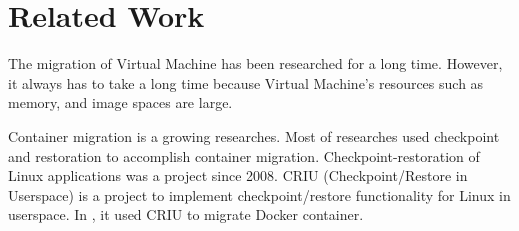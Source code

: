 \chapter{Related Work}
\label{chap:related}

The migration of Virtual Machine \cite{clark2005live, liu2013performance} has been researched for a long time.
However, it always has to take a long time because Virtual Machine's resources such as memory, and image spaces are large.

Container migration is a growing researches. Most of researches used checkpoint and restoration to accomplish container migration.
Checkpoint-restoration of Linux applications \cite{laadan2010linux} was a project since 2008. CRIU (Checkpoint/Restore in Userspace) is a project to implement checkpoint/restore functionality for Linux in userspace.
In \cite{yang2015checkpoint}, it used CRIU to migrate Docker container.